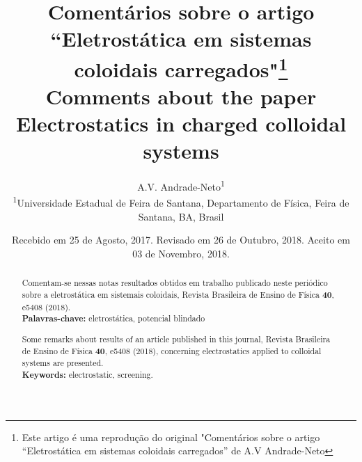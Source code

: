 \documentclass[brazilian,10.7pt,a4paper]{article}
\title{\textbf{Comentários sobre o artigo ``Eletrostática em sistemas coloidais carregados"}\footnote{Este artigo é uma reprodução do original "Comentários sobre o artigo “Eletrostática em sistemas
coloidais carregados” de A.V Andrade-Neto}\\
\vspace{5pt}\small{\textbf{Comments about the paper Electrostatics in charged colloidal systems}}\vspace{-3pt}}
\author{A.V. Andrade-Neto\textsuperscript{1}\vspace{7pt}\\ 
\small{\textsuperscript{1}Universidade Estadual de Feira de Santana, Departamento de Física, Feira de Santana, BA, Brasil}\vspace{6pt}}
\date{\small{Recebido em 25 de Agosto, 2017. Revisado em 26 de Outubro, 2018. Aceito em 03 de Novembro, 2018.}\vspace{-45pt}}
\begin{document}
\renewcommand{\abstractname}{}
\frenchspacing
\maketitle
\thispagestyle{title}
\begin{abstract}
Comentam-se nessas notas resultados obtidos em trabalho publicado neste periódico sobre a eletrostática em
sistemais coloidais, Revista Brasileira de Ensino de Física \textbf{40}, e5408 (2018).\\
\textbf{Palavras-chave:} eletrostática, potencial blindado\\
\par
Some remarks about results of an article published in this journal, Revista Brasileira de Ensino de Física \textbf{40},
e5408 (2018), concerning electrostatics applied to colloidal systems are presented.\\
\textbf{Keywords:} electrostatic, screening.\\
\end{abstract}
\end{document}

